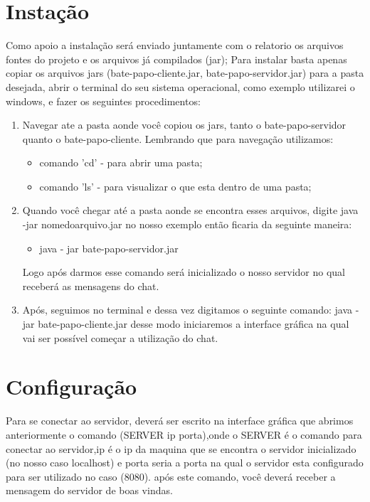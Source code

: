 \documentclass{abnt}
\begin{document}
	\section{Instação}	
	Como apoio a instalação será enviado juntamente com o relatorio os arquivos fontes do projeto e os arquivos já compilados (jar); Para instalar basta apenas copiar os arquivos jars (bate-papo-cliente.jar, bate-papo-servidor.jar) para a pasta desejada, abrir o terminal do seu sistema operacional, como exemplo utilizarei o windows, e fazer os seguintes procedimentos:
	\begin{enumerate}
	
	\item  Navegar ate a pasta aonde você copiou os jars, tanto o bate-papo-servidor quanto o bate-papo-cliente.
	Lembrando que para navegação utilizamos: 
	
	\begin{itemize}
	\item comando 'cd' - para abrir uma pasta;
	\item comando 'ls' - para visualizar o que esta dentro de uma pasta;
	\end{itemize}	
	
	\item Quando você chegar até a pasta aonde se encontra esses arquivos, digite java -jar nomedoarquivo.jar
	no nosso exemplo então ficaria da seguinte maneira:
	\begin{itemize}
	\item java - jar bate-papo-servidor.jar
	\end{itemize}
	Logo após darmos esse comando será inicializado o nosso servidor no qual receberá as mensagens do chat.
	
	\item Após, seguimos no terminal e dessa vez digitamos o seguinte comando: java -jar bate-papo-cliente.jar
	desse modo iniciaremos a interface gráfica na qual vai ser possível começar a utilização do chat.
	\end{enumerate}
	
	\section{Configuração}	
	Para se conectar ao servidor, deverá ser escrito na interface gráfica que abrimos anteriormente o comando (SERVER ip porta),onde o SERVER é o comando para conectar ao servidor,ip é o ip da maquina que se encontra o servidor inicializado (no nosso caso localhost) e porta seria a porta na qual o servidor esta configurado para ser utilizado no caso (8080). 
	após este comando, você deverá receber a mensagem do servidor de boas vindas. 	
\end{document}
